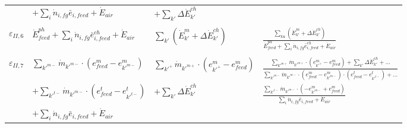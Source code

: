 \begin{table}[htbp]
\begin{tabular*}{\linewidth}{@{\extracolsep{\fill}}llll}
	& $+\sum_i \dot{n}_{i,fg}\bar{e}_{i,feed}+\dot{E}_{air}$ & $+\sum_{k'}\Delta{\dot{E}}^{ch}_{k'}$ & \\ 	
	& & & \\
	$\varepsilon_{II,6}$ & $\dot{E}^{ph}_{feed}+\sum_i \dot{n}_{i,fg}\bar{e}^{ch}_{i,feed}+\dot{E}_{air}$ & $\sum_{k'}\left(\dot{E}^{m}_{k'}+\Delta{\dot{E}}^{ch}_{k'}\right)$ & $\frac{\sum_{ku}\left(\dot{E}^{m}_{k'}+\Delta{\dot{E}}^{ch}_{k'}\right)}{\dot{E}^{ph}_{feed}+\sum_i \dot{n}_{i,fg}\bar{e}^{ch}_{i,feed}+\dot{E}_{air}}$ \\ 	
	& & & \\
	$\varepsilon_{II,7}$ & $\sum_{k'^{m-}} \dot{m}_{k'^{m-}}\cdot(e_{feed}^{m}-e_{k'^{m-}}^{m})$
	& $\sum_{k'^{+}}\dot{m}_{k'^{m+}}\cdot(e_{k'^{+}}^{m}-e_{feed}^{m})$ & $\frac{\sum_{k'^{m+}}\dot{m}_{k'^{m+}}\cdot(e_{k'^{+}}^{m}-e_{feed}^{m})+\sum_{k'}\Delta{\dot{E}}^{ch}_{k'}+\dots}{\sum_{k'^{m-}} \dot{m}_{k'^{m-}}\cdot(e_{feed}^{m}-e_{k'^{m-}}^{m})\cdot(e_{feed}^{t}-e_{k'^{t-}}^{t})+\dots}$ \\
	&$+\sum_{k'^{t-}} \dot{m}_{k'^{m-}}\cdot(e_{feed}^{t}-e_{k'^{t-}}^{t})$ & $+\sum_{k'}\Delta{\dot{E}}^{ch}_{k'}$ & $\frac{\sum_{k'^{t-}} \dot{m}_{k'^{m-}} \cdot(-e_{k'^{m-}}^{m}+e_{feed}^{m})}{\sum_i \dot{n}_{i,fg}\bar{e}_{i,feed}+\dot{E}_{air}}$ \\
	&$+\sum_i \dot{n}_{i,fg}\bar{e}_{i,feed}+\dot{E}_{air}$ & & \\
	\bottomrule
    \end{tabular*}%
  \label{tab:efficiency}%
\end{table}%


	


